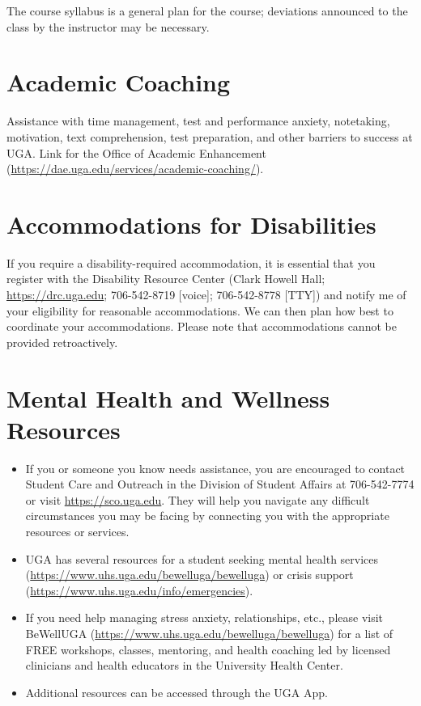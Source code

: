 \documentclass[12pt]{article}
\begin{document}
The course syllabus is a general plan for the course; deviations announced to the class by the instructor may be necessary.


\clearpage

\vspace{-2mm}
\section*{\normalsize Academic Coaching}
\vspace{-4mm}

Assistance with time management, test and performance anxiety,
notetaking, motivation, text comprehension, test preparation, and
other barriers to success at UGA. Link for the Office of Academic
Enhancement (\url{https://dae.uga.edu/services/academic-coaching/}). 

\vspace{-2mm}
\section*{\normalsize Accommodations for Disabilities}
\vspace{-4mm}

If you require a disability-required accommodation, it is essential
that you register with the Disability Resource Center (Clark Howell
Hall; \url{https://drc.uga.edu}; 706-542-8719 [voice]; 706-542-8778 [TTY])
and notify me of your eligibility for reasonable accommodations. We
can then plan how best to coordinate your accommodations. Please note
that accommodations cannot be provided retroactively.



\vspace{-2mm}
\section*{\normalsize Mental Health and Wellness Resources}
\vspace{-4mm}

\begin{itemize}
  \item If you or someone you know needs assistance, you are
    encouraged to contact Student Care and Outreach in the Division of
    Student Affairs at 706-542-7774 or visit \url{https://sco.uga.edu}. They
    will help you navigate any difficult circumstances you may be facing
    by connecting you with the appropriate resources or services.
  \item UGA has several resources for a student seeking mental health
    services (\url{https://www.uhs.uga.edu/bewelluga/bewelluga}) or crisis
    support (\url{https://www.uhs.uga.edu/info/emergencies}).
  \item If you need help managing stress anxiety, relationships, etc.,
    please visit BeWellUGA (\url{https://www.uhs.uga.edu/bewelluga/bewelluga})
    for a list of FREE workshops, classes, mentoring, and health
    coaching led by licensed clinicians and health educators in the
    University Health Center.
  \item Additional resources can be accessed through the UGA App.
\end{itemize}
\end{document}
